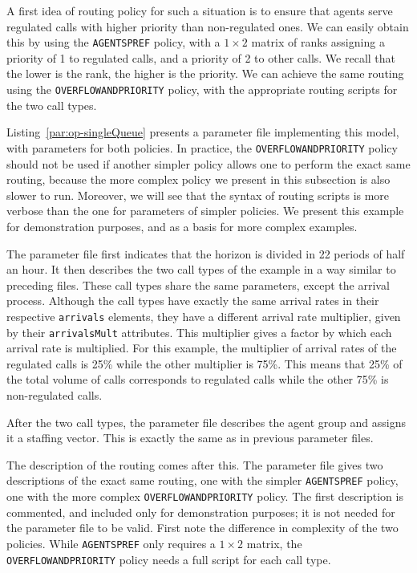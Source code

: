 A first idea of routing policy for such a situation is to ensure that
agents serve regulated calls with higher priority than non-regulated
ones. We can easily obtain this by using the \texttt{AGENTSPREF} policy, with
a $1\times 2$ matrix of ranks assigning a priority of 1 to regulated
calls, and a priority of 2 to other calls.
We recall that the lower is the rank, the higher is the priority.
We can achieve the same routing using the \texttt{OVERFLOWANDPRIORITY}
policy, with the appropriate routing scripts for the two call types.

Listing~\ref{par:op-singleQueue} presents a parameter file
implementing this model, with parameters for both policies.
In practice, the \texttt{OVERFLOWANDPRIORITY} policy should not be
used if another simpler policy allows one to perform the exact same
routing, because the more complex policy we present in this subsection
is also slower to run.
Moreover, we will see that the syntax of routing scripts is more
verbose than the one for parameters of simpler policies.
We present this example for demonstration purposes, and as a basis for
more complex examples.



The parameter file first indicates that the horizon is divided in 22
periods of half an hour.
It then describes the two call types of the
example in a way similar to preceding files.
These call types share the same parameters, except the
arrival process. Although the call types have exactly the same arrival
rates in their respective \texttt{arrivals} elements, they have a
different arrival rate multiplier, given by their
\texttt{arrivals\-Mult} attributes. This multiplier gives a factor by
which each arrival rate is multiplied.
For this example, the multiplier of arrival rates of the regulated
calls is 25\% while the other multiplier is 75\%.
This means that 25\% of the total volume of calls corresponds
to regulated calls while the other 75\% is non-regulated calls.

After the two call types, the parameter file describes the agent group
and assigns it a staffing vector.
This is exactly the same as in previous parameter files.

The description of the routing comes after this.
The parameter file gives two descriptions of the exact same routing,
one with the simpler \texttt{AGENTSPREF} policy, one with the more
complex \texttt{OVERFLOWANDPRIORITY} policy.
The first description is commented, and included only for
demonstration purposes; it is not needed for the parameter file to be
valid.
First note the difference in complexity of the two policies. While
\texttt{AGENTSPREF} only requires a $1\times 2$ matrix, the
\texttt{OVERFLOWANDPRIORITY} policy needs a full script for each call
type.

